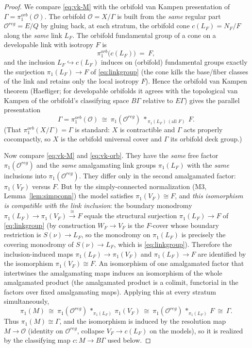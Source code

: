 \documentclass[12pt]{article}
\theoremstyle{definition}
\begin{document}
\begin{proof}
We compare \eqref{eq:vk-M} with the orbifold van Kampen presentation of
$\Gamma=\pi_1^{orb}(\mathcal O)$. The orbifold $\mathcal O=X/\Gamma$ is built from
the \emph{same} regular part $\mathcal O^{reg}=E/Q$ by gluing back, at each
stratum, the orbifold cone $c(L_F)=N_F/F$ along the \emph{same} link $L_F$. The
orbifold fundamental group of a cone on a developable link with isotropy $F$ is
\[
   \pi_1^{orb}\big(c(L_F)\big)\ =\ F,
\]
and the inclusion $L_F\hookrightarrow c(L_F)$ induces on (orbifold) fundamental
groups exactly the surjection $\pi_1(L_F)\to F$ of \eqref{eq:linkgroup} (the cone
kills the base/fiber classes of the link and retains only the local isotropy $F$).
Hence the orbifold van Kampen theorem (Haefliger; for developable orbifolds it
agrees with the topological van Kampen of the orbifold's classifying space
$B\Gamma$ relative to $E\Gamma$) gives the parallel presentation
\begin{equation}\label{eq:vk-orb}
   \Gamma=\pi_1^{orb}(\mathcal O)\ \cong\ \pi_1(\mathcal O^{reg})\
   *_{\,\pi_1(L_F)\ (\text{all }F)}\ F .
\end{equation}
(That $\pi_1^{orb}(X/\Gamma)=\Gamma$ is standard: $X$ is contractible and
$\Gamma$ acts properly cocompactly, so $X$ is the orbifold universal cover and
$\Gamma$ its orbifold deck group.)

Now compare \eqref{eq:vk-M} and \eqref{eq:vk-orb}. They have the \emph{same}
free factor $\pi_1(\mathcal O^{reg})$ and the \emph{same} amalgamating link
groups $\pi_1(L_F)$ with the \emph{same} inclusions into $\pi_1(\mathcal
O^{reg})$. They differ only in the second amalgamated factor: $\pi_1(V_F)$ versus
$F$. But by the simply-connected normalization (M3, Lemma~\ref{lem:simpconn}) the
model satisfies $\pi_1(V_F)\cong F$, and \emph{this isomorphism is compatible
with the link inclusion}: the boundary monodromy
$\pi_1(L_F)\to\pi_1(V_F)\xrightarrow{\cong}F$ equals the structural surjection
$\pi_1(L_F)\to F$ of \eqref{eq:linkgroup} (by construction $W_F\to V_F$ is the
$F$-cover whose boundary restriction is $S(\nu)\to L_F$, so the monodromy on
$\pi_1(L_F)$ is precisely the covering monodromy of $S(\nu)\to L_F$, which is
\eqref{eq:linkgroup}). Therefore the inclusion-induced maps
$\pi_1(L_F)\to\pi_1(V_F)$ and $\pi_1(L_F)\to F$ are identified by the
isomorphism $\pi_1(V_F)\cong F$. An isomorphism of one amalgamated factor that
intertwines the amalgamating maps induces an isomorphism of the whole
amalgamated product (the amalgamated product is a colimit, functorial in the
factors over fixed amalgamating maps). Applying this at every stratum
simultaneously,
\[
   \pi_1(M)\ \cong\ \pi_1(\mathcal O^{reg})\,*_{\pi_1(L_F)}\,\pi_1(V_F)
   \ \cong\ \pi_1(\mathcal O^{reg})\,*_{\pi_1(L_F)}\,F\ \cong\ \Gamma .
\]
Thus $\pi_1(M)\cong\Gamma$, and the isomorphism is induced by the resolution map
$M\to\mathcal O$ (identity on $\mathcal O^{reg}$, collapse $V_F\to c(L_F)$ on the
models), so it is realized by the classifying map $c\colon M\to B\Gamma$ used
below.


\end{proof}
\end{document}
